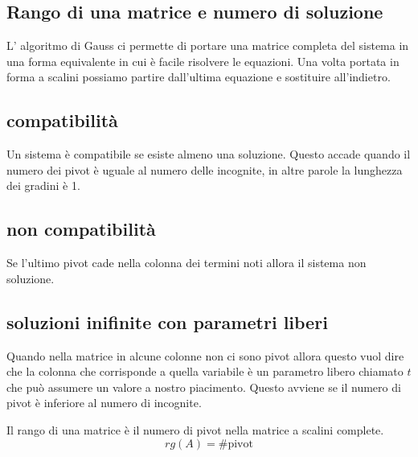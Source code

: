 \documentclass{report}
\begin{document}
\subsection{Rango di una matrice e numero di soluzione}
L' algoritmo di Gauss ci permette di portare una matrice completa del sistema in una forma equivalente in cui è facile risolvere le equazioni. Una volta portata in forma a scalini possiamo partire dall'ultima equazione e sostituire all'indietro.
\subsection{compatibilità}
Un sistema è compatibile se esiste almeno una soluzione. Questo accade quando il numero dei pivot è uguale al numero delle incognite, in altre parole la lunghezza dei gradini è 1.
\subsection{non compatibilità}
Se l'ultimo pivot cade nella colonna dei termini noti allora il sistema non soluzione.
\subsection{soluzioni inifinite con parametri liberi}
Quando nella matrice in alcune colonne non ci sono pivot allora questo vuol dire che la colonna che corrisponde a quella variabile è un parametro libero chiamato \(t\) che può assumere un valore a nostro piacimento. Questo avviene se il numero di pivot è inferiore al numero di incognite.
\begin{tcolorbox}[title=rango]
  Il rango di una matrice è il numero di pivot nella matrice a scalini complete.
  \begin{equation}
    rg(A) =  \text{\#pivot}
    \end{equation}
  \end{tcolorbox}
\end{document}
